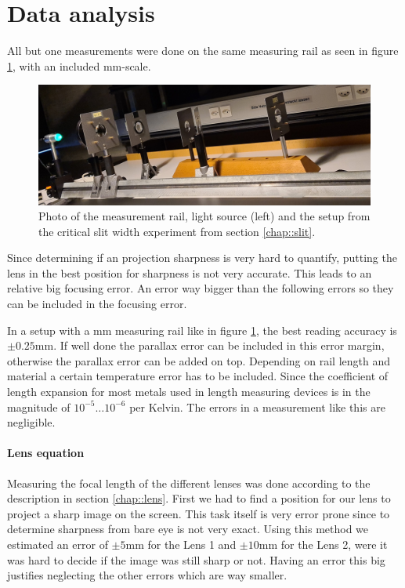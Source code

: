 \section{Data analysis}

All but one measurements were done on the same measuring rail as seen in figure \ref{fig::rail}, with an included \si{\milli \m}-scale. 
\begin{figure}[h!]
	\centering
	\includegraphics[width=\textwidth]{img/railcut.jpeg}
	\caption{Photo of the measurement rail, light source (left) and the setup from the critical slit width experiment from section \ref{chap::slit}.}
	\label{fig::rail}
\end{figure}

Since determining if an projection sharpness is very hard to quantify, putting the lens in the best position for sharpness is not very accurate.
This leads to an relative big focusing error.
An error way bigger than the following errors so they can be included in the focusing error.


In a setup with a \si{\milli \m} measuring rail like in figure \ref{fig::rail}, the best reading accuracy is $\pm 0.25 \si{\milli \m}$. 
If well done the parallax error can be included in this error margin, otherwise the parallax error can be added on top.
Depending on rail length and material a certain temperature error has to be included. 
Since the coefficient of length expansion for most metals used in length measuring devices is in the magnitude of $10^{-5} \dots 10^{-6}$ per Kelvin.
The errors in a measurement like this are negligible. 

\paragraph{Lens equation}
Measuring the focal length of the different lenses was done according to the description in section \ref{chap::lens}. 
First we had to find a position for our lens to project a sharp image on the screen.
This task itself is very error prone since to determine sharpness from bare eye is not very exact.
Using this method we estimated an error of $\pm 5$\si{\milli\m} for the Lens 1 and $\pm 10$\si{\milli\m} for the Lens 2, were it was hard to decide if the image was still sharp or not.
Having an error this big justifies neglecting the other errors which are way smaller.

